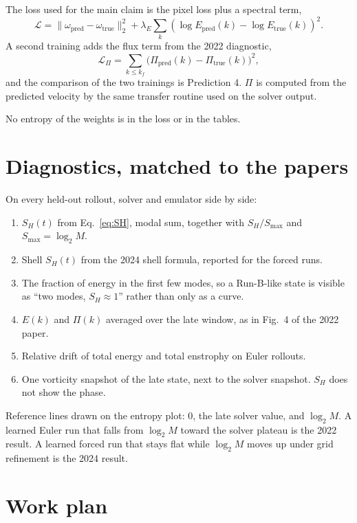 \documentclass[11pt,a4paper]{article}
\begin{document}
The loss used for the main claim is the pixel loss plus a spectral term,
\[
  \mathcal{L}
  = \|\omega_{\mathrm{pred}}-\omega_{\mathrm{true}}\|_2^2
  + \lambda_E\sum_k\left(\log E_{\mathrm{pred}}(k)-\log E_{\mathrm{true}}(k)\right)^2.
\]
A second training adds the flux term from the 2022 diagnostic,
\[
  \mathcal{L}_\Pi = \sum_{k\le k_f}\big(\Pi_{\mathrm{pred}}(k)-\Pi_{\mathrm{true}}(k)\big)^2,
\]
and the comparison of the two trainings is Prediction 4.
\(\Pi\) is computed from the predicted velocity by the same transfer routine used on the solver output.

No entropy of the weights is in the loss or in the tables.

\section{Diagnostics, matched to the papers}

On every held-out rollout, solver and emulator side by side:

\begin{enumerate}
  \item \(S_H(t)\) from Eq.~\eqref{eq:SH}, modal sum, together with \(S_H/S_{\max}\) and \(S_{\max}=\log_2 M\).
  \item Shell \(S_H(t)\) from the 2024 shell formula, reported for the forced runs.
  \item The fraction of energy in the first few modes, so a Run-B-like state is visible as ``two modes, \(S_H\approx 1\)'' rather than only as a curve.
  \item \(E(k)\) and \(\Pi(k)\) averaged over the late window, as in Fig.~4 of the 2022 paper.
  \item Relative drift of total energy and total enstrophy on Euler rollouts.
  \item One vorticity snapshot of the late state, next to the solver snapshot. \(S_H\) does not show the phase.
\end{enumerate}

Reference lines drawn on the entropy plot: \(0\), the late solver value, and \(\log_2 M\).
A learned Euler run that falls from \(\log_2 M\) toward the solver plateau is the 2022 result.
A learned forced run that stays flat while \(\log_2 M\) moves up under grid refinement is the 2024 result.

\section{Work plan}
\end{document}

